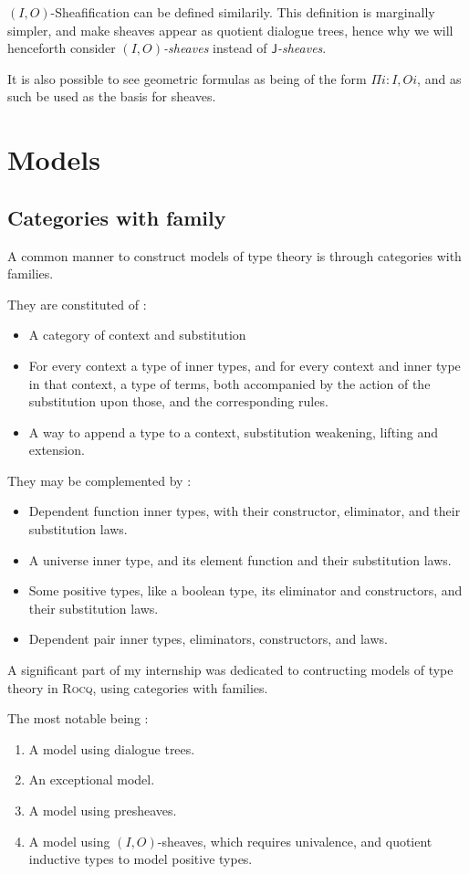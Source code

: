 \documentclass[11pt]{article}
\newcommand{\0}{\mathbf{0}}
\newcommand{\1}{\mathbf{1}}
\begin{document}
$(I,O)$-Sheafification can be defined similarily. This definition is marginally simpler, and make sheaves appear as quotient dialogue trees, hence why we will henceforth consider \emph{$(I,O)$-sheaves} instead of \emph{$\mathsf{J}$-sheaves}.

It is also possible to see geometric formulas as being of the form $\Pi i : I, O i$, and as such be used as the basis for sheaves.

\section{Models}\label{Models}

\subsection{Categories with family}

A common manner to construct models of type theory is through categories with families.

They are constituted of :
\begin{itemize}
    \item A category of context and substitution
    \item For every context a type of inner types, and for every context and inner type in that context, a type of terms, both accompanied by the action of the substitution upon those, and the corresponding rules.
    \item A way to append a type to a context, substitution weakening, lifting and extension.
\end{itemize}
They may be complemented by :
\begin{itemize}
    \item Dependent function inner types, with their constructor, eliminator, and their substitution laws.
    \item A universe inner type, and its element function and their substitution laws.
    \item Some positive types, like a boolean type, its eliminator and constructors, and their substitution laws.
    \item Dependent pair inner types, eliminators, constructors, and laws.
\end{itemize}

A significant part of my internship was dedicated to contructing models of type theory in \textsc{Rocq}, using categories with families.

The most notable being :
\begin{enumerate}
    \item A model using dialogue trees.
    \item An exceptional model.
    \item A model using presheaves.
    \item A model using $(I,O)$-sheaves, which requires univalence, and quotient inductive types to model positive types.
\end{enumerate}
\end{document}
